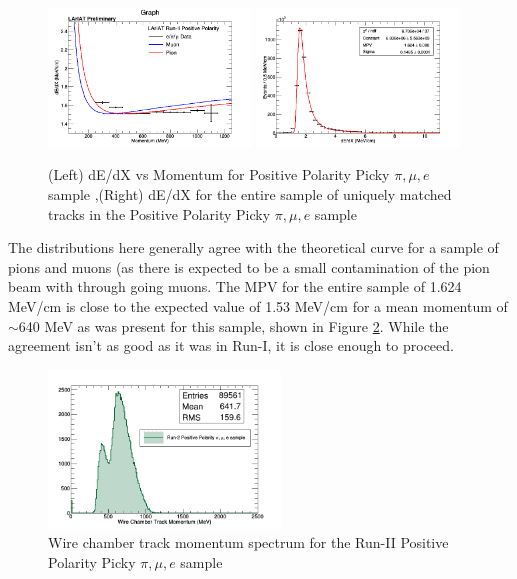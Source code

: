 \begin{figure}[htb]
\centering
\includegraphics[width=0.48\textwidth]{images/dEdXvsMomentumPosPolRun2FineBin.png}
\includegraphics[width=0.48\textwidth]{images/dEdXPosPolRun2.png}
\caption{(Left) dE/dX vs Momentum for Positive Polarity Picky $\pi, \mu, e$ sample ,(Right) dE/dX for the entire sample of uniquely matched tracks in the Positive Polarity Picky $\pi, \mu, e$ sample }
\label{fig:Run2PosPickyTrkPiMuEResults}
\end{figure}

The distributions here generally agree with the theoretical curve for a sample of pions and muons (as there is expected to be a small contamination of the pion beam with through going muons. The MPV for the entire sample of 1.624 MeV/cm is close to the expected value of 1.53 MeV/cm for a mean momentum of $\sim$640 MeV as was present for this sample, shown in Figure \ref{fig:Run2PosPickyTrkPiMuEMomentumSpec}. While the agreement isn't as good as it was in Run-I, it is close enough to proceed.

\begin{figure}[htb]
\centering
\includegraphics[width=0.55\textwidth]{images/WCTrkMomentumRun2PosPiMuE.png}
\caption{Wire chamber track momentum spectrum for the Run-II Positive Polarity Picky $\pi, \mu, e$ sample  }
\label{fig:Run2PosPickyTrkPiMuEMomentumSpec}
\end{figure}

